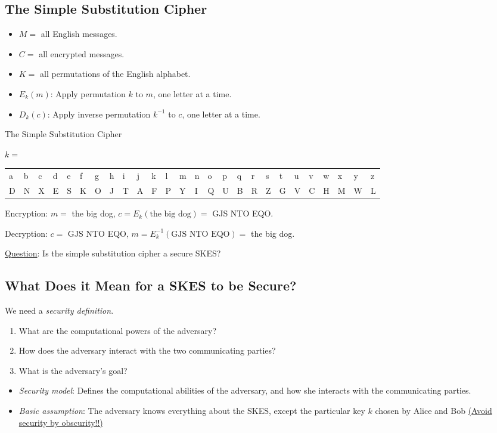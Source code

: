 \subsection*{The Simple Substitution Cipher}
\begin{itemize}
      \item $M=$ all English messages.
      \item $C=$ all encrypted messages.
      \item $K=$ all permutations of the English alphabet.
      \item $E_{k}(m)$: Apply permutation $k$ to $m$, one letter at a time.
      \item $D_{k}(c)$: Apply inverse permutation $k^{-1}$ to $c$, one letter at a time.
\end{itemize}
\begin{Example}{The Simple Substitution Cipher}{}
      \begin{center}
            $k=$\;\;\begin{tabularx}{0.7\linewidth}{@{}YYYYYYYYYYYYYYYYYYYYYYYYYY@{}}
                  a & b & c & d & e & f & g & h & i & j & k & l & m & n & o & p & q & r & s & t & u & v & w & x & y & z \\
                  D & N & X & E & S & K & O & J & T & A & F & P & Y & I & Q & U & B & R & Z & G & V & C & H & M & W & L
            \end{tabularx}
      \end{center}
      Encryption: $ m= $ the big dog, $ c=E_k(\text{the big dog})= $ GJS NTO EQO\@.

      Decryption: $ c= $ GJS NTO EQO, $ m=E_k^{-1}(\text{GJS NTO EQO})= $
      the big dog.
\end{Example}

\underline{Question}: Is the simple substitution cipher a secure SKES\@?

\subsection*{What Does it Mean for a SKES to be Secure?}
We need a \emph{security definition}.
\begin{enumerate}
      \item What are the computational powers of the adversary?
      \item How does the adversary interact with the two communicating parties?
      \item What is the adversary's goal?
\end{enumerate}
\begin{itemize}
      \item \emph{Security model}: Defines the computational
            abilities of the adversary, and how she interacts
            with the communicating parties.
      \item \emph{Basic assumption}: The adversary knows everything about the
            SKES, except the particular key $k$ chosen by Alice and Bob
            \underline{(Avoid security by obscurity!!)}
\end{itemize}
